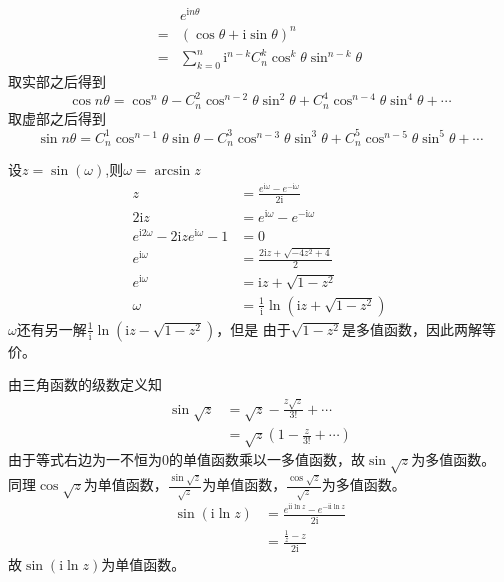 \documentclass{phyasgn}
\renewcommand{\i}{\mathrm{i}}
\begin{document}
\begin{sol}[5]
    $$\begin{aligned}
        &e^{\i n\theta}\\
        =&(\cos\theta+\i\sin\theta)^n\\
        =&\sum_{k=0}^{n}\i^{n-k}C_n^k\cos^k\theta\sin^{n-k}\theta
    \end{aligned}$$
    取实部之后得到
    $$\cos n\theta=\cos^n\theta-C_n^2\cos^{n-2}\theta\sin^2\theta+C_n^4\cos^{n-4}\theta\sin^4\theta+\cdots$$
    取虚部之后得到
    $$\sin n\theta=C_n^1\cos^{n-1}\theta\sin\theta-C_n^3\cos^{n-3}\theta\sin^3\theta+C_n^5\cos^{n-5}\theta\sin^5\theta+\cdots$$
\end{sol}\par

\begin{sol}[6]
    设$z=\sin(\omega)$,则$\omega=\arcsin z$
    $$\begin{aligned}
        z&=\frac{e^{\i\omega}-e^{-\i\omega}}{2\i}\\
        2\i z&=e^{\i\omega}-e^{-\i\omega}\\
        e^{\i2\omega}-2\i ze^{\i\omega}-1&=0\\
        e^{\i\omega}&=\frac{2\i z+\sqrt{-4z^2+4}}{2}\\
        e^{\i\omega}&=\i z+\sqrt{1-z^2}\\
        \omega&=\frac{1}{\i}\ln(\i z+\sqrt{1-z^2})
    \end{aligned}$$
    $\omega$还有另一解$\frac{1}{\i}\ln(\i z-\sqrt{1-z^2})$，但是
    由于$\sqrt{1-z^2}$是多值函数，因此两解等价。    
\end{sol}\par

\begin{sol}[7]
    由三角函数的级数定义知
    $$\begin{aligned}
        \sin\sqrt{z}&=\sqrt{z}-\frac{z\sqrt{z}}{3!}+\cdots\\
        &=\sqrt{z}(1-\frac{z}{3!}+\cdots)
    \end{aligned}$$
    由于等式右边为一不恒为0的单值函数乘以一多值函数，故$\sin\sqrt{z}$为多值函数。\\
    同理$\cos\sqrt{z}$为单值函数，$\frac{\sin\sqrt{z}}{\sqrt{z}}$为单值函数，$\frac{\cos\sqrt{z}}{\sqrt{z}}$为多值函数。
    $$\begin{aligned}
        \sin(\i\ln z)&=\frac{e^{\i\i\ln z}-e^{-\i\i\ln z}}{2\i}\\
        &=\frac{\frac{1}{z}-z}{2\i}
    \end{aligned}$$    
    故$\sin(\i\ln z)$为单值函数。
\end{sol}\par
\end{document}
